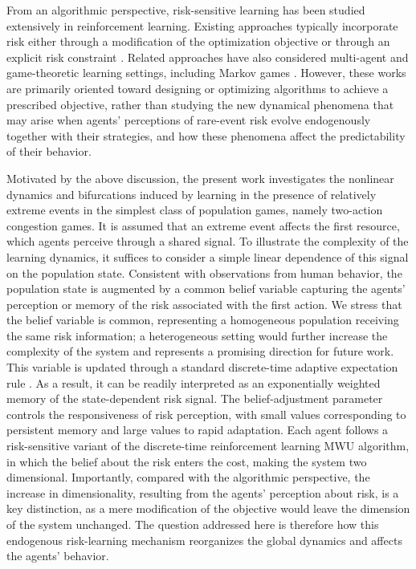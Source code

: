 \documentclass{article}
\theoremstyle{plain}
\theoremstyle{definition}
\begin{document}
From an algorithmic perspective, risk-sensitive learning has been studied extensively in reinforcement learning. Existing approaches typically incorporate risk either through a modification of the optimization objective or through an explicit risk constraint \cite{mihatsch_risk,tamar_cvar,prashanth_risk}. Related approaches have also considered multi-agent and game-theoretic learning settings, including Markov games \cite{tian_riskgame,qiu_rmix}. However, these works are primarily oriented toward designing or optimizing algorithms to achieve a prescribed objective, rather than studying the new dynamical phenomena that may arise when agents' perceptions of rare-event risk evolve endogenously together with their strategies, and how these phenomena affect the predictability of their behavior.

Motivated by the above discussion, the present work investigates the nonlinear dynamics and bifurcations induced by learning in the presence of relatively extreme events in the simplest class of population games, namely two-action congestion games. It is assumed that an extreme event affects the first resource, which agents perceive through a shared signal. To illustrate the complexity of the learning dynamics, it suffices to consider a simple linear dependence of this signal on the population state. Consistent with observations from human behavior, the population state is augmented by a common belief variable capturing the agents' perception or memory of the risk associated with the first action. We stress that the belief variable is common, representing a homogeneous population receiving the same risk information; a heterogeneous setting would further increase the complexity of the system and represents a promising direction for future work. This variable is updated through a standard discrete-time adaptive expectation rule \cite{hommes}. As a result, it can be readily interpreted as an exponentially weighted memory of the state-dependent risk signal. The belief-adjustment parameter controls the responsiveness of risk perception, with small values corresponding to persistent memory and large values to rapid adaptation. Each agent follows a risk-sensitive variant of the discrete-time reinforcement learning MWU algorithm, in which the belief about the risk enters the cost, making the system two dimensional. Importantly, compared with the algorithmic perspective, the increase in dimensionality, resulting from the agents' perception about risk, is a key distinction, as a mere modification of the objective would leave the dimension of the system unchanged. The question addressed here is therefore how this endogenous risk-learning mechanism reorganizes the global dynamics and affects the agents' behavior.
\end{document}
